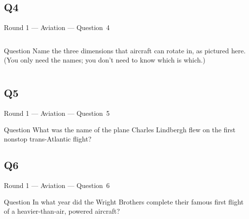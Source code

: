 \documentclass[11pt]{beamer}
\begin{document}
\subsection*{Q4}
\begin{frame}[t]{Round 1 --- Aviation --- \mbox{Question 4}}
    \vspace{-0.5em}
    \begin{columns}[T,totalwidth=\linewidth]
        \begin{column}{0.32\linewidth}
            \begin{block}{Question}
                Name the three dimensions that aircraft can rotate in, as pictured here. (You only need the names; you don't need to know which is which.)
            \end{block}
        \end{column}
        \begin{column}{0.65\linewidth}
            \begin{center}
                \texttt{[image: \{Images/rollpitchyaw]}.png}
            \end{center}
        \end{column}
    \end{columns}
\end{frame}
\subsection*{Q5}
\begin{frame}[t]{Round 1 --- Aviation --- \mbox{Question 5}}
    \vspace{-0.5em}
    \begin{block}{Question}
        What was the name of the plane Charles Lindbergh flew on the first nonstop trans-Atlantic flight?
    \end{block}
\end{frame}
\subsection*{Q6}
\begin{frame}[t]{Round 1 --- Aviation --- \mbox{Question 6}}
    \vspace{-0.5em}
    \begin{block}{Question}
        In what year did the Wright Brothers complete their famous first flight of a heavier-than-air, powered aircraft?
    \end{block}
\end{frame}
\end{document}
